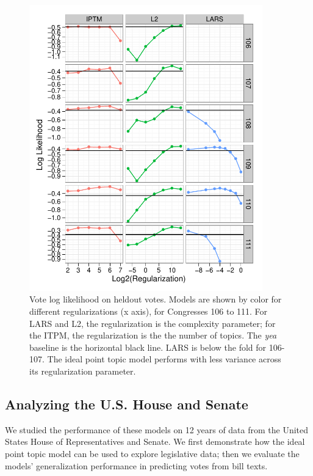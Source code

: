 \begin{figure}
\label{fig:log_likelihood}
\begin{center}
  \includegraphics[width=0.9\textwidth]
{chapter_predicting_votes_with_text/figures/138_log_likelihood_by_session_topics.pdf}
\end{center}
\vspace{-6pt}
\caption{Vote log likelihood on heldout votes. Models are shown
  by color for different regularizations (x axis), for Congresses 106
  to 111.  For LARS and L2, the regularization is the complexity
  parameter; for the ITPM, the regularization is the the number of
  topics.  The \emph{yea} baseline is the horizontal black line. LARS
  is below the fold for 106-107.  The ideal point topic model performs
  with less variance across its regularization parameter. }
\vspace{-3pt}
\end{figure}
\subsection*{Analyzing the U.S. House and Senate}
\label{sec:experiments}

We studied the performance of these models on 12 years of data from
the United States House of Representatives and Senate.  We first
demonstrate how the ideal point topic model can be used to explore
legislative data; then we evaluate the models' generalization
performance in predicting votes from bill texts.

